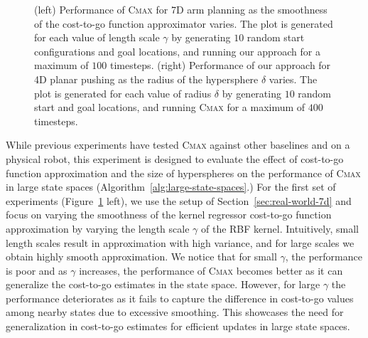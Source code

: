 \begin{figure}[t]
\begin{subfigure}{0.4\linewidth}
  \end{subfigure}
  \caption{(left) Performance of \textsc{Cmax} for 7D arm planning as
    the smoothness of the cost-to-go function approximator varies. The plot is
    generated for each value of length scale $\gamma$ by generating
    $10$ random start configurations and goal locations, and running
    our approach for a maximum of $100$ timesteps. (right) Performance
    of our approach for 4D planar pushing as the radius of the
    hypersphere $\delta$ varies. The plot is generated for each value
    of radius $\delta$ by generating $10$ random start and goal
    locations, and running \textsc{Cmax} for a maximum of $400$ timesteps.}
  \label{fig:gamma-radius}
  
\end{figure}

While previous experiments have tested \textsc{Cmax} against other
baselines and on a physical robot, this experiment is designed to
evaluate the effect of cost-to-go function approximation and the size
of hyperspheres on the
performance of \textsc{Cmax} in large state spaces (Algorithm~\ref{alg:large-state-spaces}.)
For the first set of experiments (Figure~\ref{fig:gamma-radius} left), we use the setup of
Section~\ref{sec:real-world-7d} and focus on varying the smoothness of the kernel
regressor cost-to-go function approximation
by varying the length scale $\gamma$ of the RBF kernel.
Intuitively, small length scales result in approximation with high
variance, and for large scales we obtain highly smooth approximation.
We notice that for small $\gamma$, the performance is poor and
as $\gamma$ increases, the performance of \textsc{Cmax}
becomes better as it can generalize the cost-to-go estimates
in the state space. However, for large $\gamma$ the performance
deteriorates as it fails to capture the difference in cost-to-go
values among nearby states due to excessive smoothing. This showcases
the need for generalization in cost-to-go
estimates for efficient updates in large state spaces.

